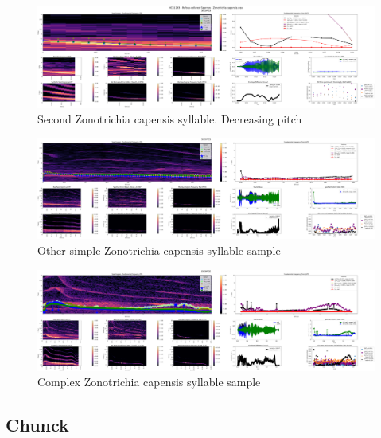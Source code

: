 \begin{figure}[H]
    \centering
    \includegraphics[width=1\linewidth]{Images/ScoresVariables-syllable-XC11293 - Rufous-collared Sparrow - Zonotrichia capensis.wav-0.png}
    \caption{Second Zonotrichia capensis syllable. Decreasing pitch}
    \label{fig:zonotrichia_1}
\end{figure}


\begin{figure}[H]
    \centering
    \includegraphics[width=1\linewidth]{Images/ScoresVariables-syllable-4_short_FINCA153_Zonotrichia_capensis_trimed.wav-0.png}
    \caption{Other simple Zonotrichia capensis syllable sample}
    \label{fig:zonotrichia_other}
\end{figure}


\begin{figure}[H]
    \centering
    \includegraphics[width=1\linewidth]{Images/ScoresVariables-syllable-2_short_FINCA_H2N_180919-144222_Zonotrichia_capensis.wav-0.png}
    \caption{Complex Zonotrichia capensis syllable sample}
    \label{fig:zonotrichia_complex}
\end{figure}


\subsection{Chunck}

